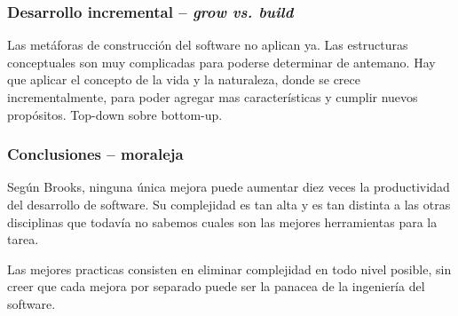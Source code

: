 \documentclass{beamer}
\begin{document}
\begin{frame}[fragile]
  \frametitle{Desarrollo incremental -- \textit{grow vs. build}}
  Las met\'aforas de construcci\'on del software no aplican ya. Las estructuras conceptuales son muy
  complicadas para poderse determinar de antemano. Hay que aplicar el concepto de la vida y la naturaleza,
  donde se crece incrementalmente, para poder agregar mas caracter\'isticas y cumplir nuevos prop\'ositos.
  Top-down sobre bottom-up.
\end{frame}
%

\begin{frame}[fragile]
  \frametitle{Conclusiones -- moraleja}
  Seg\'un Brooks, ninguna \'unica mejora puede aumentar diez veces la productividad del desarrollo de software.
  Su complejidad es tan alta y es tan distinta a las otras disciplinas que todav\'ia no sabemos cuales
  son las mejores herramientas para la tarea.

  Las mejores practicas consisten en eliminar complejidad en todo nivel posible, sin creer que cada
  mejora por separado puede ser la panacea de la ingenier\'ia del software.
\end{frame}
\end{document}
